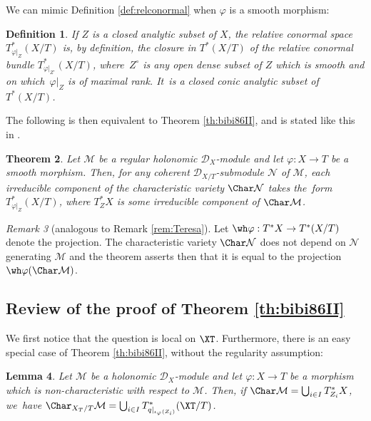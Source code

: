 \documentclass{amsart}
\theoremstyle{plain}
\newtheorem{theorem}{Theorem}
\numberwithin{theorem}{section}
\newtheorem{lemma}[theorem]{Lemma}
\newtheorem{definition}[theorem]{Definition}
\theoremstyle{definition}
\theoremstyle{remark}
\newtheorem{remark}[theorem]{Remark}
\theoremstyle{definition}
\newcommand{\cD}{\mathcal{D}}
\newcommand{\cM}{\mathcal{M}}
\newcommand{\cN}{\mathcal{N}}
\begin{document}
We can mimic Definition \ref{def:relconormal} when $\varphi$ is a smooth morphism:

\begin{definition}
If $Z$ is a closed analytic subset of $X$, the \emph{relative conormal space} $T^*_{\varphi|_Z}(X/T)$ is, by definition, the closure in $T^*(X/T)$ of the relative conormal bundle $T^*_{\varphi|_{Z^\circ}}(X/T)$, where~$Z^\circ$ is any open dense subset of $Z$ which is smooth and on which~$\varphi|_Z$ is of maximal rank. It~is a closed conic analytic subset of $T^*(X/T)$.
\end{definition}

The following is then equivalent to Theorem \ref{th:bibi86II}, and is stated like this in \cite[Th.\,3.2]{Sab2}.

\begin{theorem}\label{thm:equivformrelcc}
Let $\cM$ be a regular holonomic $\cD_X$-module and let \hbox{$\varphi:X\!\to\! T$} be a smooth morphism. Then, for any coherent $\cD_{X/T}$-submodule $\cN$ of $\cM$, each irreducible component of the characteristic variety $\Char\cN$ takes the~form~\hbox{$T^*_{\varphi|_{Z}}\!(X/T)$}, where $T^*_ZX$ is some irreducible component of $\Char\cM$.
\end{theorem}

\begin{remark}[analogous to Remark \ref{rem:Teresa}]
Let $\wh\varphi:T^*X\to T^*(X/T)$ denote the projection. The characteristic variety $\Char\cN$ does not depend on $\cN$ generating $\cM$ and the theorem asserts then that it is equal to the projection $\wh\varphi(\Char\cM)$.
\end{remark}

\subsection{Review of the proof of Theorem \ref{th:bibi86II}}
We first notice that the question is local on $\XT$. Furthermore, there is an easy special case of Theorem \ref{th:bibi86II}, without the regularity assumption:

\begin{lemma}\label{lem:nonchar}
Let $\cM$ be a holonomic $\cD_X$-module and let $\varphi:X\to T$ be a morphism which is non-characteristic with respect to $\cM$. Then, if $\Char\cM=\bigcup_{i\in I}T^*_{Z_i}X$, we~have $\Char_{X_T/T}\cM=\bigcup_{i\in I}T^*_{q|_{\iota_\varphi(Z_i)}}(\XT/T)$.
\end{lemma}
\end{document}
